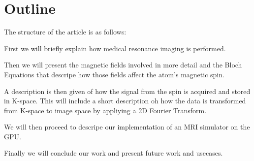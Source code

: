 



\section{Outline}

The structure of the article is as follows:

First we will briefly explain how medical resonance imaging is
performed.

Then we will present the magnetic fields involved in more detail and
the Bloch Equations that descripe how those fields affect the atom's
magnetic spin.

A description is then given of how the signal from the spin is
acquired and stored in K-space. This will include a short description
oh how the data is transformed from K-space to image space by
appliying a 2D Fourier Transform.

We will then proceed to descripe our implementation of an MRI
simulator on the GPU.

Finally we will conclude our work and present future work and
usecases.
